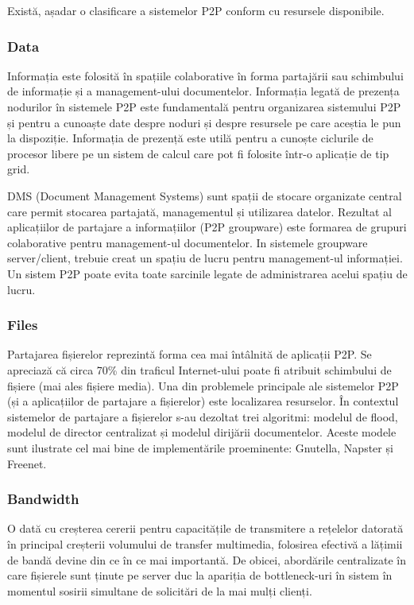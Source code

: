 Există, așadar o clasificare a sistemelor P2P conform cu resursele
disponibile.

\subsubsection{Data}

Informația este folosită în spațiile colaborative în forma partajării sau
schimbului de informație și a management-ului documentelor. Informația legată
de prezența nodurilor în sistemele P2P este fundamentală pentru organizarea
sistemului P2P și pentru a cunoaște date despre noduri și despre resursele pe
care aceștia le pun la dispoziție. Informația de prezență este utilă pentru a
cunoște ciclurile de procesor libere pe un sistem de calcul care pot fi
folosite într-o aplicație de tip grid.

DMS (Document Management Systems) sunt spații de stocare organizate central
care permit stocarea partajată, managementul și utilizarea datelor. Rezultat
al aplicațiilor de partajare a informațiilor (P2P groupware) este formarea de
grupuri colaborative pentru management-ul documentelor. In sistemele groupware
server/client, trebuie creat un spațiu de lucru pentru management-ul
informației. Un sistem P2P poate evita toate sarcinile legate de administrarea
acelui spațiu de lucru.

\subsubsection{Files}

Partajarea fișierelor reprezintă forma cea mai întâlnită de aplicații P2P. Se
apreciază că circa 70\% din traficul Internet-ului poate fi atribuit schimbului
de fișiere (mai ales fișiere media). Una din problemele principale ale
sistemelor P2P (și a aplicațiilor de partajare a fișierelor) este localizarea
resurselor. În contextul sistemelor de partajare a fișierelor s-au dezoltat
trei algoritmi: modelul de flood, modelul de director centralizat și modelul
dirijării documentelor. Aceste modele sunt ilustrate cel mai bine de
implementările proeminente: Gnutella, Napster și Freenet.

\subsubsection{Bandwidth}

O dată cu creșterea cererii pentru capacitățile de transmitere a rețelelor
datorată în principal creșterii volumului de transfer multimedia, folosirea
efectivă a lățimii de bandă devine din ce în ce mai importantă. De obicei,
abordările centralizate în care fișierele sunt ținute pe server duc la
apariția de bottleneck-uri în sistem în momentul sosirii simultane de
solicitări de la mai mulți clienți.

